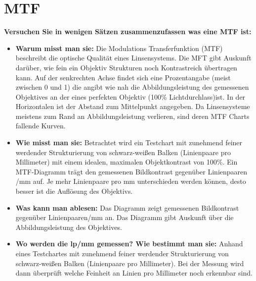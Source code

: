 \documentclass[a4paper]{article}
\begin{document}
	\section{MTF}
	\textbf{Versuchen Sie in wenigen Sätzen zusammenzufassen was eine MTF ist:}\\
	\begin{itemize}
		\item \textbf{Warum misst man sie:} Die Modulations Transferfunktion (MTF) beschreibt die optische Qualität eines Linsensystems. Die MFT gibt Auskunft darüber, wie fein ein Objektiv Strukturen noch Kontrastreich übertragen kann. Auf der senkrechten Achse findet sich eine Prozentangabe (meist zwischen 0 und 1) die angibt wie nah die Abbildungsleistung des gemessenen Objektives an der eines perfekten Objektiv (100\% Lichtdurchlass)ist.
		In der Horizontalen ist der Abstand zum Mittelpunkt angegeben. Da Linsensysteme meistens zum Rand an Abbildungsleistung verlieren, sind deren MTF Charts fallende Kurven.\\
		\item \textbf{Wie misst man sie:} Betrachtet wird ein Testchart mit zunehmend feiner werdender Strukturierung von schwarz-weißen Balken (Linienpaare pro Millimeter) mit einem idealen, maximalen Objektkontrast von 100\%. Ein MTF-Diagramm trägt den gemessenen Bildkontrast gegenüber Linienpaaren /mm auf. Je mehr Linienpaare pro mm unterschieden werden können, desto besser ist die Auflösung des Objektivs.\\
		\item \textbf{Was kann man ablesen:} Das Diagramm zeigt gemessenen Bildkontrast gegenüber Linienpaaren/mm an. Das Diagramm gibt Auskunft über die Abbildungsleistung des Objektives.\\
		\item \textbf{Wo werden die lp/mm gemessen? Wie bestimmt man sie:} Anhand eines Testchartes mit zunehmend feiner werdender Strukturierung von schwarz-weißen Balken (Linienpaare pro Millimeter). Bei der Messung wird dann überprüft welche Feinheit an Linien pro Millimeter noch erkennbar sind. \\
	\end{itemize}
	
	\newpage
	
\end{document}
